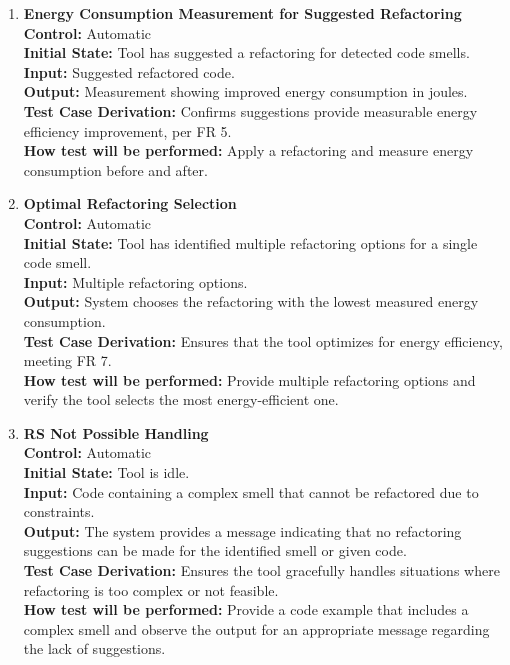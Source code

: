 \documentclass[12pt, titlepage]{article}
\begin{document}
\begin{enumerate}[label={\bf \textcolor{Maroon}{test-FR-RS-\arabic*}}, wide=0pt, font=\itshape]
  \item \textbf{Energy Consumption Measurement for Suggested Refactoring}\\[2mm]
    \textbf{Control:} Automatic \\
    \textbf{Initial State:} Tool has suggested a refactoring for detected code smells.\\
    \textbf{Input:} Suggested refactored code.\\
    \textbf{Output:} Measurement showing improved energy consumption in joules.\\[2mm]
    \textbf{Test Case Derivation:} Confirms suggestions provide measurable energy efficiency improvement, per FR 5.\\[2mm]
    \textbf{How test will be performed:} Apply a refactoring and measure energy consumption before and after.
  
  \item \textbf{Optimal Refactoring Selection}\\[2mm]
    \textbf{Control:} Automatic \\
    \textbf{Initial State:} Tool has identified multiple refactoring options for a single code smell.\\
    \textbf{Input:} Multiple refactoring options.\\
    \textbf{Output:} System chooses the refactoring with the lowest measured energy consumption.\\[2mm]
    \textbf{Test Case Derivation:} Ensures that the tool optimizes for energy efficiency, meeting FR 7.\\[2mm]
    \textbf{How test will be performed:} Provide multiple refactoring options and verify the tool selects the most energy-efficient one.
  
  \item \textbf{RS Not Possible Handling}\\[2mm]
    \textbf{Control:} Automatic \\
    \textbf{Initial State:} Tool is idle.\\
    \textbf{Input:} Code containing a complex smell that cannot be refactored due to constraints.\\
    \textbf{Output:} The system provides a message indicating that no refactoring suggestions can be made for the identified smell or given code.\\[2mm]
    \textbf{Test Case Derivation:} Ensures the tool gracefully handles situations where refactoring is too complex or not feasible.\\[2mm]
    \textbf{How test will be performed:} Provide a code example that includes a complex smell and observe the output for an appropriate message regarding the lack of suggestions.


\end{enumerate}
\end{document}
